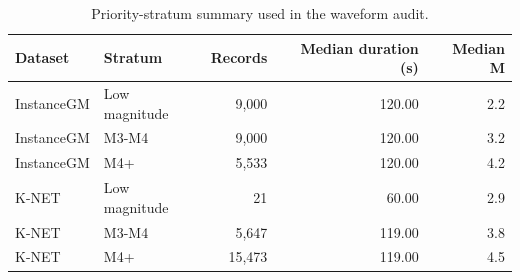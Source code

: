 \begin{table}[!htbp]
\centering
\caption{Priority-stratum summary used in the waveform audit.}
\label{tab:priority}
\begin{singlespace}
\footnotesize
\setlength{\tabcolsep}{3pt}
\begin{tabular*}{0.82\textwidth}{@{\extracolsep{\fill}}llrrr@{}}
\toprule
Dataset & Stratum & Records & Median duration (s) & Median M \\
\midrule
InstanceGM & Low magnitude & 9,000 & 120.00 & 2.2 \\
InstanceGM & M3-M4 & 9,000 & 120.00 & 3.2 \\
InstanceGM & M4+ & 5,533 & 120.00 & 4.2 \\
K-NET & Low magnitude & 21 & 60.00 & 2.9 \\
K-NET & M3-M4 & 5,647 & 119.00 & 3.8 \\
K-NET & M4+ & 15,473 & 119.00 & 4.5 \\
\bottomrule
\end{tabular*}
\end{singlespace}
\end{table}
